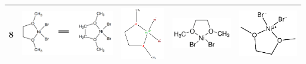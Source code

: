\begin{landscape}
\begin{longtable}{m{0.3cm}
                >{\centering}m{4.8cm}
                >{\centering}m{4.8cm}
                >{\centering}m{4.8cm}
                >{\centering\arraybackslash}m{4.8cm}}
 8 &
 \includegraphics[width=4.7cm]{imagenes/resultados/anexo_expertos/mol8.png} & 
 \includegraphics[width=2.2cm]{imagenes/resultados/anexo_expertos/mol8_openbabel.png} & 
 \includegraphics[width=3cm]{imagenes/sigmaAldrich/Nickel(II) bromide ethylene glycol dimethyl ether complex.png} & 
 \includegraphics[width=3cm]{imagenes/sciFinder/pdf/Dibromo(1,2-dimethoxyethane)nickel(II).pdf} \\
\midrule


\end{longtable}
\end{landscape}
